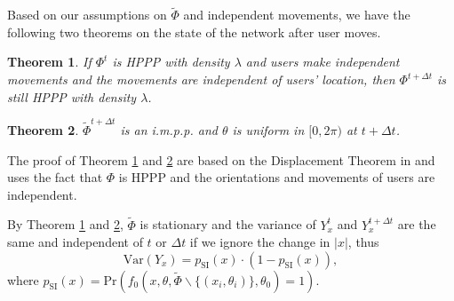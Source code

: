 \documentclass[10pt, conference, letterpaper]{IEEEtran}
\newtheorem{theorem}{Theorem}
\DeclareMathOperator*{\unif}{unif}
\begin{document}
Based on our assumptions on $\tilde{\Phi}$ and independent movements, we have the following two theorems on the state of the network after user moves.

\begin{theorem}\label{theorem:hppp}
	If $\Phi^t$ is HPPP with density $\lambda$ and users make independent movements and the movements are independent of users' location, then $\Phi^{t+\Delta t}$ is still HPPP with density $\lambda$. 
\end{theorem} 

\begin{theorem}\label{theorem:hppp_orientation}
	$\tilde{\Phi}^{t+\Delta t}$ is an i.m.p.p. and $\theta$ is uniform in $[0, 2\pi)$ at $t+ \Delta t$. 
\end{theorem}

The proof of Theorem \ref{theorem:hppp} and \ref{theorem:hppp_orientation} are based on the Displacement Theorem in \cite{poisson} and uses the fact that $\Phi$ is HPPP and the orientations and movements of users are independent.

By Theorem \ref{theorem:hppp} and \ref{theorem:hppp_orientation}, $\tilde{\Phi}$ is stationary and the variance of $Y_x^t$ and $Y_x^{t+\Delta t}$ are the same and independent of $t$ or $\Delta t$ if we ignore the change in $|x|$, thus
\begin{equation*}
\mathrm{Var}(Y_x)=p_{\mathrm{SI}}(x)\cdot (1-p_{\mathrm{SI}}(x)),
\end{equation*}
where $p_{\mathrm{SI}}(x)=\mathrm{Pr}(f_0(x,\theta,\tilde{\Phi}\backslash\{(x_i,\theta_i)\}, \theta_0)=1)$. 
\end{document}
